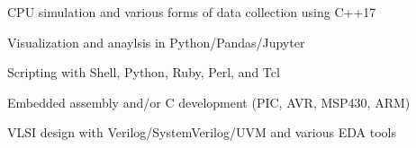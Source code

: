 \begin{plainlist}
	\item CPU simulation and various forms of data collection using C++17
	\item Visualization and anaylsis in Python/Pandas/Jupyter
        \item Scripting with Shell, Python, Ruby, Perl, and Tcl
	\item Embedded assembly and/or C development (PIC, AVR, MSP430, ARM)
	\item VLSI design with Verilog/SystemVerilog/UVM and various EDA tools
\end{plainlist}

